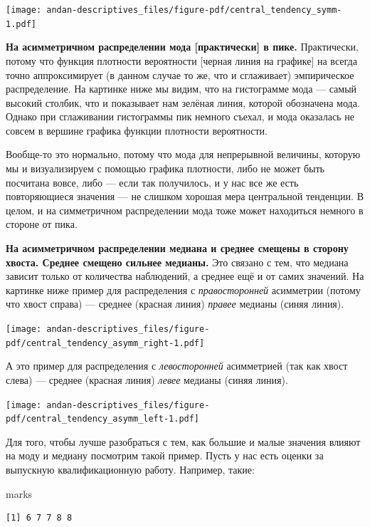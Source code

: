 \documentclass[
  letterpaper,
]{scrbook}
\newenvironment{Shaded}{}{}
\newcommand{\NormalTok}[1]{\textcolor[rgb]{0.14,0.16,0.18}{#1}}
\theoremstyle{definition}
\theoremstyle{remark}
\begin{document}
\texttt{[image: andan-descriptives\_files/figure-pdf/central\_tendency\_symm-1.pdf]}

\textbf{На асимметричном распределении мода {[}практически{]} в пике.}
Практически, потому что функция плотности вероятности {[}черная линия на
графике{]} на всегда точно аппроксимирует (в данном случае то же, что и
сглаживает) эмпирическое распределение. На картинке ниже мы видим, что
на гистограмме мода --- самый высокий столбик, что и показывает нам
зелёная линия, которой обозначена мода. Однако при сглаживании
гистограммы пик немного съехал, и мода оказалась не совсем в вершине
графика функции плотности вероятности.

Вообще-то это нормально, потому что мода для непрерывной величины,
которую мы и визуализируем с помощью графика плотности, либо не может
быть посчитана вовсе, либо --- если так получилось, и у нас все же есть
повторяющиеся значения --- не слишком хорошая мера центральной
тенденции. В целом, и на симметричном распределении мода тоже может
находиться немного в стороне от пика.

\textbf{На асимметричном распределении медиана и среднее смещены в
сторону хвоста. Среднее смещено сильнее медианы.} Это связано с тем, что
медиана зависит только от количества наблюдений, а среднее ещё и от
самих значений. На картинке ниже пример для распределения с
\emph{правосторонней} асимметрии (потому что хвост справа) --- среднее
(красная линия) \emph{правее} медианы (синяя линия).

\texttt{[image: andan-descriptives\_files/figure-pdf/central\_tendency\_asymm\_right-1.pdf]}

А это пример для распределения с \emph{левосторонней} асимметрией (так
как хвост слева) --- среднее (красная линия) \emph{левее} медианы (синяя
линия).

\texttt{[image: andan-descriptives\_files/figure-pdf/central\_tendency\_asymm\_left-1.pdf]}

Для того, чтобы лучше разобраться с тем, как большие и малые значения
влияют на моду и медиану посмотрим такой пример. Пусть у нас есть оценки
за выпускную квалификационную работу. Например, такие:

\begin{Shaded}
\begin{Highlighting}[]
\NormalTok{marks}
\end{Highlighting}
\end{Shaded}

\begin{verbatim}
[1] 6 7 7 8 8
\end{verbatim}
\end{document}
